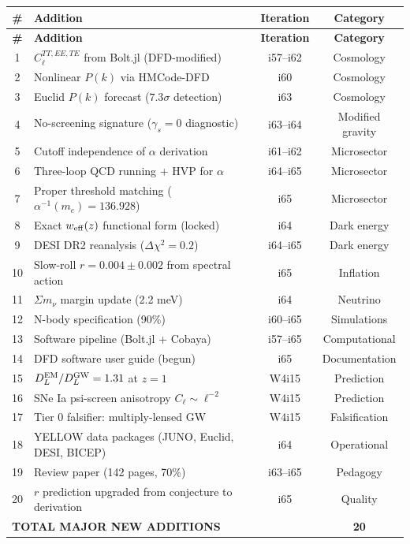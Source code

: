 \documentclass[11pt,a4paper]{article}
\begin{document}
\begin{center}
\begin{longtable}{clcc}
\toprule
\textbf{\#} & \textbf{Addition} & \textbf{Iteration} & \textbf{Category} \\
\midrule
\endfirsthead
\toprule
\textbf{\#} & \textbf{Addition} & \textbf{Iteration} & \textbf{Category} \\
\midrule
\endhead
1 & $C_\ell^{TT,EE,TE}$ from Bolt.jl (DFD-modified) & i57--i62 & Cosmology \\
2 & Nonlinear $P(k)$ via HMCode-DFD & i60 & Cosmology \\
3 & Euclid $P(k)$ forecast ($7.3\sigma$ detection) & i63 & Cosmology \\
4 & No-screening signature ($\gamma_s = 0$ diagnostic) & i63--i64 & Modified gravity \\
5 & Cutoff independence of $\alpha$ derivation & i61--i62 & Microsector \\
6 & Three-loop QCD running + HVP for $\alpha$ & i64--i65 & Microsector \\
7 & Proper threshold matching ($\alpha^{-1}(m_e) = 136.928$) & i65 & Microsector \\
8 & Exact $w_{\rm eff}(z)$ functional form (locked) & i64 & Dark energy \\
9 & DESI DR2 reanalysis ($\Delta\chi^2 = 0.2$) & i64--i65 & Dark energy \\
10 & Slow-roll $r = 0.004 \pm 0.002$ from spectral action & i65 & Inflation \\
11 & $\Sigma m_\nu$ margin update (2.2 meV) & i64 & Neutrino \\
12 & N-body specification (90\%) & i60--i65 & Simulations \\
13 & Software pipeline (Bolt.jl + Cobaya) & i57--i65 & Computational \\
14 & DFD software user guide (begun) & i65 & Documentation \\
15 & $D_L^{\rm EM}/D_L^{\rm GW} = 1.31$ at $z=1$ & W4i15 & Prediction \\
16 & SNe Ia psi-screen anisotropy $C_\ell \sim \ell^{-2}$ & W4i15 & Prediction \\
17 & Tier 0 falsifier: multiply-lensed GW & W4i15 & Falsification \\
18 & YELLOW data packages (JUNO, Euclid, DESI, BICEP) & i64 & Operational \\
19 & Review paper (142 pages, 70\%) & i63--i65 & Pedagogy \\
20 & $r$ prediction upgraded from conjecture to derivation & i65 & Quality \\
\midrule
\multicolumn{3}{l}{\textbf{TOTAL MAJOR NEW ADDITIONS}} & \textbf{20} \\
\bottomrule
\end{longtable}
\end{center}
\end{document}
